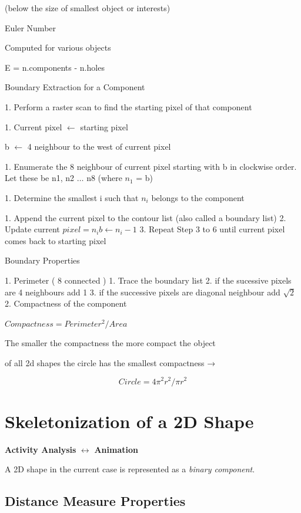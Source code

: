 \documentclass[11pt]{article}
\theoremstyle{definition}
\begin{document}
(below the size of smallest object or interests)

 Euler Number

Computed for various objects

E = n.components - n.holes

Boundary Extraction for a Component

1. Perform a raster scan to find the starting pixel of that component 

1. Current pixel $\leftarrow$ starting pixel

b $\longleftarrow$ 4 neighbour to the west of current pixel

1. Enumerate the 8 neighbour of current pixel starting with b in clockwise order. Let these be n1, n2 $\ldots$ n8 (where $n_1$ = b)


1. Determine the smallest i such that $n_i$ belongs to the component

1. Append the current pixel to the contour list (also called a boundary list)
2. Update current $pixel = n_i b \leftarrow n_i-1$
3. Repeat Step 3 to 6 until current pixel comes back to starting pixel 

Boundary Properties

1. Perimeter ( 8 connected )
    1. Trace the boundary list
    2. if the sucessive pixels are 4 neighbours add 1
    3. if the successive pixels are diagonal neighbour add $\sqrt{2}$
2. Compactness of the component
    
    $Compactness = Perimeter^2/Area$
    
    The smaller the compactness the more compact the object
    
    of all 2d shapes the circle has the smallest compactness → 
    
    $$
    Circle = 4\pi^2 r^2 / \pi r^2
    $$
    

\section{Skeletonization of a 2D Shape}

\textbf{Activity Analysis} $\leftrightarrow$ \textbf{Animation}

A 2D shape in the current case is represented as a \emph{binary component}.

\subsection{Distance Measure Properties}
\end{document}
